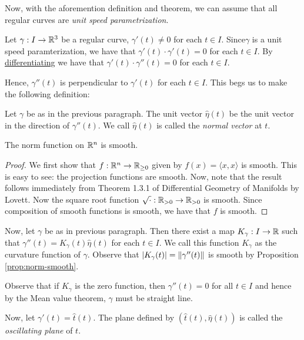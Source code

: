 Now, with the aforemention definition and theorem, we can assume that all regular curves are \textit{unit speed parametrization}.

Let $\gamma : I \to \mathbb R ^{3}$ be a regular curve, $\gamma ' (t) \ne 0$ for each $t\in I$. Since$\gamma$ is a unit speed paramterization, we have that $\gamma ' (t) \cdot \gamma ' (t) =0$ for each $t\in I$. By \href{https://math.stackexchange.com/questions/96265/differentiating-an-inner-product}{differentiating} we have that $\gamma ' (t) \cdot \gamma '' (t) = 0$ for each $t\in I$.

Hence, $\gamma '' (t)$ is perpendicular to $\gamma ' (t)$ for each $t\in I$. This begs us to make the following definition:

\begin{definition}
    Let $\gamma$ be as in the previous paragraph.
    The unit vector $\hat{\eta} (t)$ be the unit vector in the direction of $\gamma '' (t)$. We call $\hat{\eta} (t)$ is called the \textit{normal vector} at $t$.
    \label{def:normal-vector-at-a-point}
\end{definition}

\begin{proposition}
    The norm function on $\mathbb R ^{n}$ is smooth.
    \label{prop:norm-smooth}
\end{proposition}
\begin{proof}
    We first show that $f: \mathbb R ^{n} \to \mathbb R _{\ge 0}$ given by $f(x)=\langle x , x \rangle$ is smooth. This is easy to see: the projection functions are smooth. Now, note that the result follows immediately from Theorem 1.3.1 of Differential Geometry of Manifolds by Lovett. Now the square root function $\sqrt{\cdot} : \mathbb R _{> 0} \to \mathbb R _{>0}$ is smooth. Since composition of smooth functions is smooth, we have that $f$ is smooth.
\end{proof}

Now, let $\gamma$ be as in previous paragraph. Then there exist a map $K_{\gamma} : I \to \mathbb R$ such that $\gamma '' (t) = K_{\gamma} (t) \hat{\eta} (t)$ for each $t\in I$. We call this function $K_{\gamma}$ as the curvature function of $\gamma$. Observe that $|K_{\gamma} (t)|= \left\lVert \gamma '' (t) \right\rVert$ is smooth by Proposition \ref{prop:norm-smooth}.

Observe that if $K_{\gamma}$ is the zero function, then $\gamma '' (t) = 0$ for all $t \in I$ and hence by the Mean value theorem, $\gamma$ must be straight line. 

Now, let $\gamma ' (t) = \hat{t} (t)$. The plane defined by $\left( \hat{t} (t), \hat{\eta} (t) \right)$ is called the \textit{oscillating plane} of $t$.

